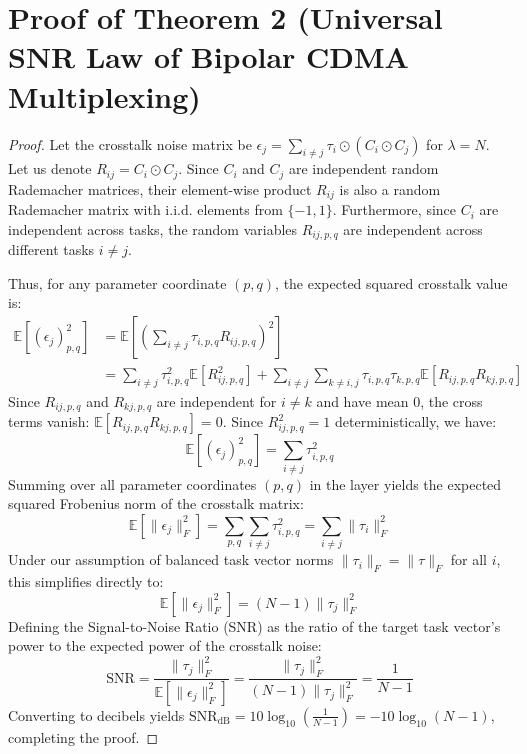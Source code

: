 \documentclass{article}
\begin{document}
\section{Proof of Theorem 2 (Universal SNR Law of Bipolar CDMA Multiplexing)}
\label{sec:proof_theorem2}

\begin{proof}
Let the crosstalk noise matrix be $\epsilon_j = \sum_{i \neq j} \tau_i \odot (C_i \odot C_j)$ for $\lambda = N$. Let us denote $R_{ij} = C_i \odot C_j$. Since $C_i$ and $C_j$ are independent random Rademacher matrices, their element-wise product $R_{ij}$ is also a random Rademacher matrix with i.i.d. elements from $\{-1, 1\}$.
Furthermore, since $C_i$ are independent across tasks, the random variables $R_{ij, p, q}$ are independent across different tasks $i \neq j$.

Thus, for any parameter coordinate $(p, q)$, the expected squared crosstalk value is:
\begin{align*}
    \mathbb{E}[(\epsilon_j)_{p, q}^2] &= \mathbb{E}\left[ \left( \sum_{i \neq j} \tau_{i, p, q} R_{ij, p, q} \right)^2 \right] \\
    &= \sum_{i \neq j} \tau_{i, p, q}^2 \mathbb{E}[R_{ij, p, q}^2] + \sum_{i \neq j} \sum_{k \neq i, j} \tau_{i, p, q} \tau_{k, p, q} \mathbb{E}[R_{ij, p, q} R_{kj, p, q}]
\end{align*}
Since $R_{ij, p, q}$ and $R_{kj, p, q}$ are independent for $i \neq k$ and have mean 0, the cross terms vanish: $\mathbb{E}[R_{ij, p, q} R_{kj, p, q}] = 0$. Since $R_{ij, p, q}^2 = 1$ deterministically, we have:
\begin{equation}
    \mathbb{E}[(\epsilon_j)_{p, q}^2] = \sum_{i \neq j} \tau_{i, p, q}^2
\end{equation}
Summing over all parameter coordinates $(p, q)$ in the layer yields the expected squared Frobenius norm of the crosstalk matrix:
\begin{equation}
    \mathbb{E}[\|\epsilon_j\|_F^2] = \sum_{p, q} \sum_{i \neq j} \tau_{i, p, q}^2 = \sum_{i \neq j} \|\tau_i\|_F^2
\end{equation}
Under our assumption of balanced task vector norms $\|\tau_i\|_F = \|\tau\|_F$ for all $i$, this simplifies directly to:
\begin{equation}
    \mathbb{E}[\|\epsilon_j\|_F^2] = (N - 1) \|\tau_j\|_F^2
\end{equation}
Defining the Signal-to-Noise Ratio (SNR) as the ratio of the target task vector's power to the expected power of the crosstalk noise:
\begin{equation}
    \text{SNR} = \frac{\|\tau_j\|_F^2}{\mathbb{E}[\|\epsilon_j\|_F^2]} = \frac{\|\tau_j\|_F^2}{(N - 1) \|\tau_j\|_F^2} = \frac{1}{N - 1}
\end{equation}
Converting to decibels yields $\text{SNR}_{\text{dB}} = 10 \log_{10}\left(\frac{1}{N-1}\right) = -10 \log_{10}(N - 1)$, completing the proof.
\end{proof}
\end{document}
